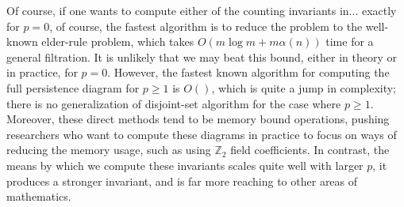 \documentclass[10pt]{article}
\numberwithin{equation}{section}
\newcommand{\+}{%
	\raisebox{0.18ex}{\scaleobj{0.55}{+}}
}
\theoremstyle{definition}
\newtheorem{definition}{Definition}
\theoremstyle{definition}
\begin{document}
Of course, if one wants to compute either of the counting invariants in... exactly for $p = 0$, of course, the fastest algorithm is to reduce the problem to the well-known elder-rule problem, which takes $O(m \log m + m \alpha(n))$ time for a general filtration. It is unlikely that we may beat this bound, either in theory or in practice, for $p = 0$.
However, the fastest known algorithm for computing the full persistence diagram for $p \geq 1$ is $O()$, which is quite a jump in complexity; there is no generalization of disjoint-set algorithm for the case where $p \geq 1$. 
Moreover, these direct methods tend to be memory bound operations, pushing researchers who want to compute these diagrams in practice to focus on ways of reducing the memory usage, such as using $\mathbb{Z}_2$ field coefficients. 
In contrast, the means by which we compute these invariants scales quite well with larger $p$, it produces a stronger invariant, and is far more reaching to other areas of mathematics. 




% 
\end{document}
